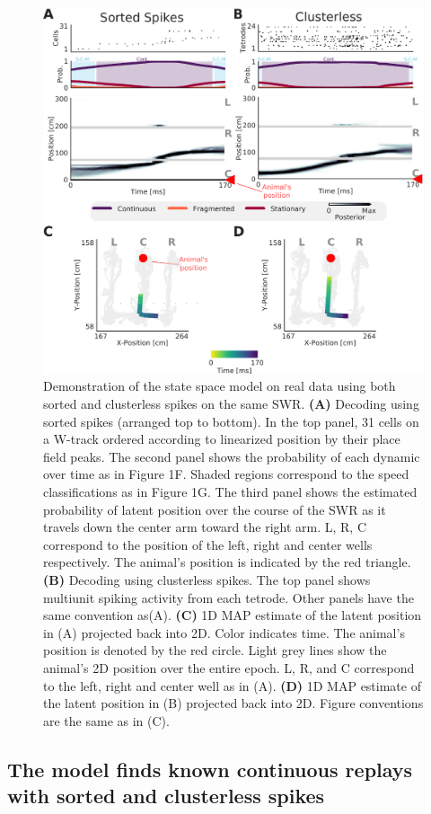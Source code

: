 \documentclass[times, twoside]{zHenriquesLab-StyleBioRxiv}
\begin{document}
\begin{figure}%
\centering
\includegraphics[width=0.80\linewidth]{figures/Figure2/Figure2_v4}
\caption{Demonstration of the state space model on real data using both sorted and clusterless spikes on the same SWR. \textbf{(A)} Decoding using sorted spikes (arranged top to bottom). In the top panel, 31 cells on a W-track ordered according to linearized position by their place field peaks. The second panel shows the probability of each dynamic over time as in Figure 1F. Shaded regions correspond to the speed classifications as in Figure 1G. The third panel shows the estimated probability of latent position over the course of the SWR as it travels down the center arm toward the right arm. L, R, C correspond to the position of the left, right and center wells respectively. The animal's position is indicated by the red triangle. \textbf{(B)} Decoding using clusterless spikes. The top panel shows multiunit spiking activity from each tetrode. Other panels have the same convention as(A).  \textbf{(C)} 1D MAP estimate of the latent position in (A) projected back into 2D. Color indicates time. The animal's position is denoted by the red circle. Light grey lines show the animal's 2D position over the entire epoch. L, R, and C correspond to the left, right and center well as in (A). \textbf{(D)} 1D MAP estimate of the latent position in (B) projected back into 2D. Figure conventions are the same as in (C).
}
\label{2}
\end{figure}
\subsection*{The model finds known continuous replays with sorted and clusterless spikes}
\end{document}
